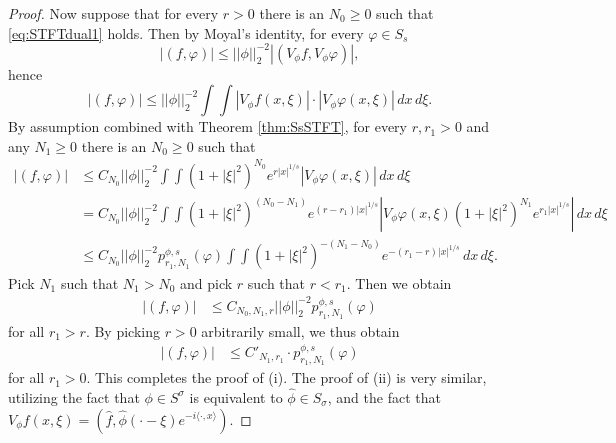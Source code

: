 \documentclass[10pt,a4paper]{amsart}
\begin{document}
\begin{proof}
Now suppose that for every $r>0$ there is an $N_0 \geq 0$ such that \eqref{eq:STFTdual1} holds. Then by Moyal's identity, for every $\varphi \in S_s $
\begin{equation*}
    |(f,\varphi)|\leq ||\phi||_2^{-2} |(V_\phi f, V_\phi \varphi)|, 
\end{equation*}
hence
\begin{equation*}
    |(f,\varphi)|\leq ||\phi||_2^{-2} \int \int |V_\phi f(x,\xi)|\cdot |V_\phi \varphi(x,\xi)| \, d x \, d \xi.
\end{equation*}
By assumption combined with Theorem \ref{thm:SsSTFT}, for every $r,r_1>0$ and any $N_1\geq 0$ there is an $N_0\geq 0$ such that
\begin{align*}
    |(f,\varphi)|&\leq C_{N_0}||\phi||_2^{-2} \int \int  (1+|\xi|^2)^{N_0} e^{r|x|^{1/s}}  |V_\phi\varphi(x,\xi)| \, d x \, d \xi \\
    &= C_{N_0}||\phi||_2^{-2} \int \int  (1+|\xi|^2)^{(N_0-N_1)} e^{(r-r_1)|x|^{1/s}}  \left|V_\phi\varphi(x,\xi)(1+|\xi|^2)^{N_1} e^{r_1|x|^{1/s}}\right| \, d x \, d \xi \\
    &\leq C_{N_0}||\phi||_2^{-2} p^{\phi,s}_{r_1,N_1}(\varphi)\int \int  (1+|\xi|^2)^{-(N_1-N_0)} e^{-(r_1-r)|x|^{1/s}} \, d x \, d \xi.
\end{align*}
Pick $N_1$ such that $N_1>N_0$ and pick $r$ such that $r<r_1$. Then we obtain
\begin{align*}
    |(f,\varphi)|&\leq   C_{N_0,N_1,r}||\phi||_2^{-2} p^{\phi,s}_{r_1,N_1}(\varphi)
\end{align*}
for all $r_1>r$. By picking $r>0$ arbitrarily small, we thus obtain
\begin{align*}
    |(f,\varphi)|&\leq   C'_{N_1,r_1}\cdot p^{\phi,s}_{r_1,N_1}(\varphi)
\end{align*}
for all $r_1>0$. This completes the proof of (i). The proof of (ii) is very similar, utilizing the fact that $\phi\in S^\sigma$ is equivalent to $\hat{\phi}\in S_\sigma $, and the fact that $V_\phi f(x,\xi) = (\hat{f},\hat{\phi}(\cdot-\xi)e^{-i\langle \cdot,x \rangle})$.    
    
\end{proof}
\end{document}
